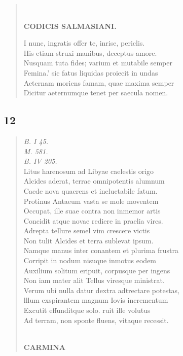 \documentclass[11pt, a4paper]{report}
\begin{document}
\begin{verse}
        ﻿\pagebreak 
    \begin{center} \textbf{CODICIS SALMASIANI.} \end{center} \marginpar{[47]} I nunc, ingratis offer te, inrise, periclis. \\ His etiam struxi manibus, deceptus amore. \\ Nusquam tuta fides; varium et mutabile semper \\ Femina.’ sic fatus liquidas proiecit in undas \\ Aeternam moriens famam, quae maxima semper \\ Dicitur aeternumque tenet per saecula nomen. \\ 
      \end{verse}
  
            \subsection*{12}
      \begin{verse}
      \textit{B. I 45.} \\ \textit{M. 581.} \\ \textit{B. IV 205.} \\ Litus harenosum  \lbrack ad \rbrack  Libyae caelestis origo \\ Alcides aderat, terrae omnipotentis alumnum \\ Caede nova quaerens et ineluctabile fatum. \\ Protinus Antaeum vasta se mole moventem \\ Occupat, ille suae contra non inmemor artis \\ Concidit atque novae rediere in praelia vires. \\ Adrepta tellure semel vim crescere victis \\ Non tulit Alcides et terra sublevat ipsum. \\ Namque manus inter conantem et plurima frustra \\ Corripit in nodum nisuque inmotus eodem \\ Auxilium solitum eripuit, corpusque per ingens \\ Non iam mater alit Tellus viresque ministrat. \\ Verum ubi nulla datur dextra adtrectare potestas, \\ lllum exspirantem magnum Iovis incrementum \\ Excutit effunditque solo. ruit ille volutus \\ Ad terram, non sponte fluens, vitaque recessit. \\ 
        ﻿\pagebreak 
    \begin{center} \textbf{CARMINA} \end{center}
      \end{verse}
  
\end{document}
